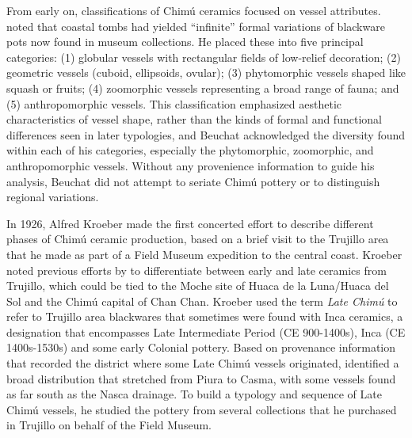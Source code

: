 \documentclass[]{interact}
\theoremstyle{plain}%
\theoremstyle{definition}
\theoremstyle{remark}
\begin{document}
From early on, classifications of Chimú ceramics focused on vessel
attributes. \citet[652-654]{RN11152} noted that coastal tombs had
yielded ``infinite'' formal variations of blackware pots now found in
museum collections. He placed these into five principal categories: (1)
globular vessels with rectangular fields of low-relief decoration; (2)
geometric vessels (cuboid, ellipsoids, ovular); (3) phytomorphic vessels
shaped like squash or fruits; (4) zoomorphic vessels representing a
broad range of fauna; and (5) anthropomorphic vessels. This
classification emphasized aesthetic characteristics of vessel shape,
rather than the kinds of formal and functional differences seen in later
typologies, and Beuchat acknowledged the diversity found within each of
his categories, especially the phytomorphic, zoomorphic, and
anthropomorphic vessels. Without any provenience information to guide
his analysis, Beuchat did not attempt to seriate Chimú pottery or to
distinguish regional variations.

In 1926, Alfred Kroeber made the first concerted effort to describe
different phases of Chimú ceramic production, based on a brief visit to
the Trujillo area that he made as part of a Field Museum expedition to
the central coast. Kroeber noted previous efforts by \citet{RN11154} to
differentiate between early and late ceramics from Trujillo, which could
be tied to the Moche site of Huaca de la Luna/Huaca del Sol and the
Chimú capital of Chan Chan. Kroeber used the term \emph{Late Chimú} to
refer to Trujillo area blackwares that sometimes were found with Inca
ceramics, a designation that encompasses Late Intermediate Period (CE
900-1400s), Inca (CE 1400s-1530s) and some early Colonial pottery. Based
on provenance information that recorded the district where some Late
Chimú vessels originated, \citet[11]{RN11151} identified a broad
distribution that stretched from Piura to Casma, with some vessels found
as far south as the Nasca drainage. To build a typology and sequence of
Late Chimú vessels, he studied the pottery from several collections that
he purchased in Trujillo on behalf of the Field Museum.
\end{document}

